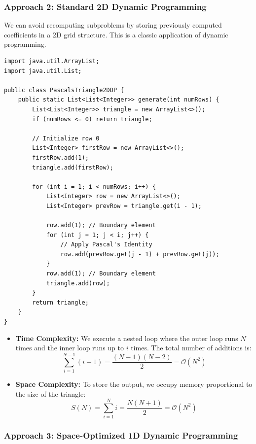 \documentclass[10pt,journal,compsoc,onecolumn]{IEEEtran}
\begin{document}
\subsubsection{Approach 2: Standard 2D Dynamic Programming}

We can avoid recomputing subproblems by storing previously computed coefficients in a 2D grid structure. This is a classic application of dynamic programming.

\begin{verbatim}
import java.util.ArrayList;
import java.util.List;

public class PascalsTriangle2DDP {
    public static List<List<Integer>> generate(int numRows) {
        List<List<Integer>> triangle = new ArrayList<>();
        if (numRows <= 0) return triangle;

        // Initialize row 0
        List<Integer> firstRow = new ArrayList<>();
        firstRow.add(1);
        triangle.add(firstRow);

        for (int i = 1; i < numRows; i++) {
            List<Integer> row = new ArrayList<>();
            List<Integer> prevRow = triangle.get(i - 1);

            row.add(1); // Boundary element
            for (int j = 1; j < i; j++) {
                // Apply Pascal's Identity
                row.add(prevRow.get(j - 1) + prevRow.get(j));
            }
            row.add(1); // Boundary element
            triangle.add(row);
        }
        return triangle;
    }
}
\end{verbatim}

\begin{itemize}
    \item \textbf{Time Complexity:} We execute a nested loop where the outer loop runs $N$ times and the inner loop runs up to $i$ times. The total number of additions is:
    \begin{equation}
    \sum_{i=1}^{N-1} (i - 1) = \frac{(N-1)(N-2)}{2} = \mathcal{O}(N^2)
    \end{equation}
    \item \textbf{Space Complexity:} To store the output, we occupy memory proportional to the size of the triangle:
    \begin{equation}
    S(N) = \sum_{i=1}^{N} i = \frac{N(N+1)}{2} = \mathcal{O}(N^2)
    \end{equation}
\end{itemize}

\subsubsection{Approach 3: Space-Optimized 1D Dynamic Programming}
\end{document}

